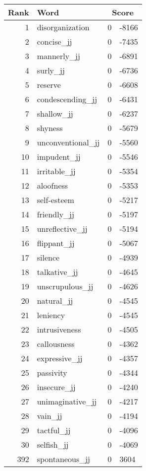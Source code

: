 \begin{longtable}[!htbp]{| rlr@{.}l |}
    \hline
    \textbf{Rank} & \textbf{Word} & \multicolumn{2}{c|}{\textbf{Score}} \\
    \hline
    \endhead
    1 & disorganization & 0 & -8166 \\
    2 & concise\_jj & 0 & -7435 \\
    3 & mannerly\_jj & 0 & -6891 \\
    4 & surly\_jj & 0 & -6736 \\
    5 & reserve & 0 & -6608 \\
    6 & condescending\_jj & 0 & -6431 \\
    7 & shallow\_jj & 0 & -6237 \\
    8 & shyness & 0 & -5679 \\
    9 & unconventional\_jj & 0 & -5560 \\
    10 & impudent\_jj & 0 & -5546 \\
    11 & irritable\_jj & 0 & -5354 \\
    12 & aloofness & 0 & -5353 \\
    13 & self-esteem & 0 & -5217 \\
    14 & friendly\_jj & 0 & -5197 \\
    15 & unreflective\_jj & 0 & -5194 \\
    16 & flippant\_jj & 0 & -5067 \\
    17 & silence & 0 & -4939 \\
    18 & talkative\_jj & 0 & -4645 \\
    19 & unscrupulous\_jj & 0 & -4626 \\
    20 & natural\_jj & 0 & -4545 \\
    21 & leniency & 0 & -4545 \\
    22 & intrusiveness & 0 & -4505 \\
    23 & callousness & 0 & -4362 \\
    24 & expressive\_jj & 0 & -4357 \\
    25 & passivity & 0 & -4344 \\
    26 & insecure\_jj & 0 & -4240 \\
    27 & unimaginative\_jj & 0 & -4217 \\
    28 & vain\_jj & 0 & -4194 \\
    29 & tactful\_jj & 0 & -4096 \\
    30 & selfish\_jj & 0 & -4069 \\
    392 & spontaneous\_jj & 0 & 3604 \\

\end{longtable}
